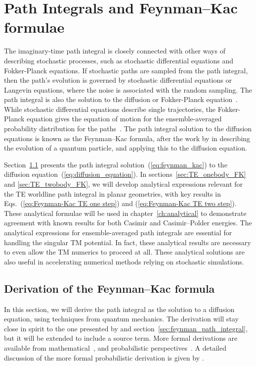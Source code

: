 \chapter{Path Integrals and Feynman--Kac formulae}

\label{ch:feynman_kac}

The imaginary-time path integral is closely connected with other ways of describing stochastic processes, 
such as stochastic differential equations and Fokker-Planck equations.
If stochastic paths are sampled from the path integral, then the path's evolution is governed by stochastic
differential equations or Langevin equations, where the noise is associated with the random sampling.
The path integral is also the solution to the diffusion or Fokker-Planck equation~\citep{Karatzas1991, Durrett1996}.
While stochastic differential equations describe single trajectories, the Fokker-Planck equation gives
the equation of motion for the ensemble-averaged probability distribution for the paths~\citep{Gardiner2009}.
The path integral solution to the diffusion equations is known as the Feynman--Kac formula,
after the work by \citet{Feynman1948} in describing the evolution of a quantum particle, and \citet{Kac1949}
 applying this to the diffusion equation.

Section~\ref{sec:derive_feynman_kac} presents the path integral solution~(\ref{eq:feynman_kac}) to the diffusion equation~(\ref{eq:diffusion_equation}).
In sections~\ref{sec:TE_onebody_FK} and \ref{sec:TE_twobody_FK}, we will develop analytical expressions relevant for the TE
worldline path integral in planar geometries, with key results in Eqs.~(\ref{eq:Feynman-Kac TE one step}) and
(\ref{eq:Feynman-Kac TE two step}).
These analytical formulae will be used in chapter~\ref{ch:analytical} to demonstrate agreement 
with known results for both Casimir and Casimir--Polder energies.
The analytical expressions for ensemble-averaged path integrals are essential for handling the singular 
TM potential.  
In fact, these analytical results are necessary to even allow the TM numerics to proceed at all.
These analytical solutions are also useful in accelerating numerical methods relying 
on stochastic simulations.  

\section{Derivation of the Feynman--Kac formula }
\label{sec:derive_feynman_kac}
In this section, we will derive the path integral as the solution to a diffusion equation,
using techniques from quantum mechanics.
The derivation will stay close in spirit to the one presented by \citet{Sakurai1994} and section~\ref{sec:feynman_path_integral}, 
but it will be extended to include a source term.  
More formal derivations are available from mathematical~\citep{Cartier2004},
and probabilistic perspectives~\citep{Karatzas1991, Durrett1996}.  
A detailed discussion of the more formal probabilistic derivation is given by \citet[section~17.9]{SteckNotes}.

